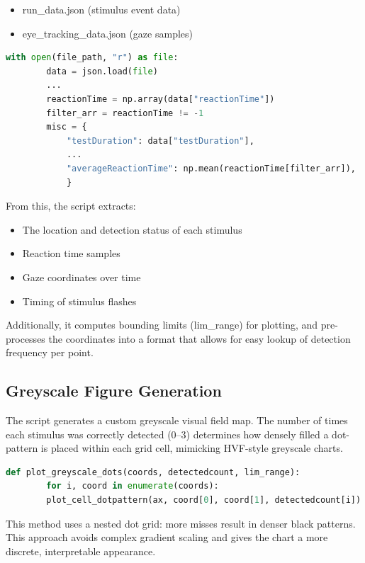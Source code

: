 \documentclass{l4proj}
\begin{document}
\begin{appendices}
\begin{itemize}
    \item run\_data.json (stimulus event data)
    \item eye\_tracking\_data.json (gaze samples)
\end{itemize}

\begin{lstlisting}[language={Python}]
    with open(file_path, "r") as file:
        data = json.load(file)
        ...
        reactionTime = np.array(data["reactionTime"])
        filter_arr = reactionTime != -1
        misc = {
            "testDuration": data["testDuration"],
            ...
            "averageReactionTime": np.mean(reactionTime[filter_arr]),
            }
\end{lstlisting}

From this, the script extracts:

\begin{itemize}
    \item The location and detection status of each stimulus
    \item Reaction time samples
    \item Gaze coordinates over time
    \item Timing of stimulus flashes
\end{itemize}

Additionally, it computes bounding limits (lim\_range) for plotting, and pre-processes the coordinates into a format that allows for easy lookup of detection frequency per point.

\subsection{Greyscale Figure Generation}
The script generates a custom greyscale visual field map. The number of times each stimulus was correctly detected (0–3) determines how densely filled a dot-pattern is placed within each grid cell, mimicking HVF-style greyscale charts.

\begin{lstlisting}[language={Python}]
    def plot_greyscale_dots(coords, detectedcount, lim_range):
        for i, coord in enumerate(coords):
        plot_cell_dotpattern(ax, coord[0], coord[1], detectedcount[i])
\end{lstlisting}

This method uses a nested dot grid: more misses result in denser black patterns. This approach avoids complex gradient scaling and gives the chart a more discrete, interpretable appearance.


\end{appendices}
\end{document}
